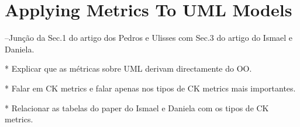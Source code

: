 \section{Applying Metrics To UML Models}

--Junção da Sec.1 do artigo dos Pedros e Ulisses com Sec.3 do artigo do Ismael e Daniela.

    * Explicar que as métricas sobre UML derivam directamente do OO.

    * Falar em CK metrics e falar apenas nos tipos de CK metrics mais importantes.

    * Relacionar as tabelas do paper do Ismael e Daniela com os tipos de CK metrics.
